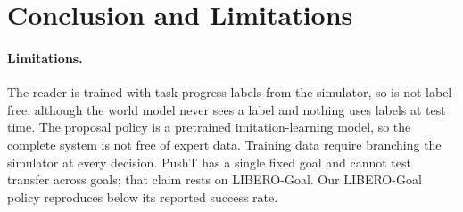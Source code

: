\section{Conclusion and Limitations}
\label{sec:conclusion}


\paragraph{Limitations.}
The reader is trained with task-progress labels from the simulator, so \method is not label-free, although the world model never sees a label and nothing uses labels at test time.
The proposal policy is a pretrained imitation-learning model, so the complete system is not free of expert data.
Training data require branching the simulator at every decision.
PushT has a single fixed goal and cannot test transfer across goals; that claim rests on LIBERO-Goal.
Our LIBERO-Goal policy reproduces below its reported success rate.
